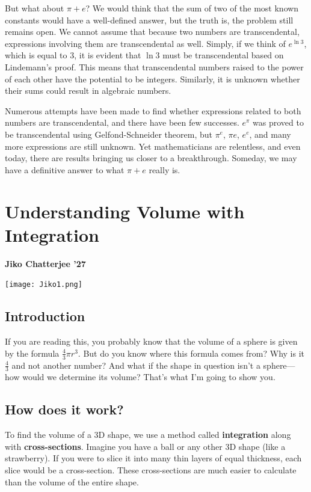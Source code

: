 \documentclass{article}
\begin{document}
\begin{multicols}{2}
But what about $\pi + e$? We would think that the sum of two of the most known constants would have a well-defined answer, but the truth is, the problem still remains open. We cannot assume that because two numbers are transcendental, expressions involving them are transcendental as well. Simply, if we think of $e^{\ln{3}}$, which is equal to $3$, it is evident that $\ln{3}$ must be transcendental based on Lindemann’s proof. This means that transcendental numbers raised to the power of each other have the potential to be integers. Similarly, it is unknown whether their sums could result in algebraic numbers.

Numerous attempts have been made to find whether expressions related to both numbers are transcendental, and there have been few successes. $e^{\pi}$ was proved to be transcendental using Gelfond-Schneider theorem, but $\pi^{e}$, $\pi e$, $e^{e}$, and many more expressions are still unknown. Yet mathematicians are relentless, and even today, there are results bringing us closer to a breakthrough. Someday, we may have a definitive answer to what $\pi + e$ really is.

\section*{Understanding Volume with Integration}
\noindent\textbf{Jiko Chatterjee '27}
\begin{center}
    \texttt{[image: Jiko1.png]}
\end{center}
\subsection*{Introduction}
If you are reading this, you probably know that the volume of a sphere is given by the formula $\frac{4}{3}\pi{r}^{3}$. But do you know where this formula comes from? Why is it $\frac{4}{3}$ and not another number? And what if the shape in question isn’t a sphere---how would we determine its volume? That’s what I’m going to show you.

\subsection*{How does it work?}

To find the volume of a 3D shape, we use a method called \textbf{integration} along with \textbf{cross-sections}. Imagine you have a ball or any other 3D shape (like a strawberry). If you were to slice it into many thin layers of equal thickness, each slice would be a cross-section. These cross-sections are much easier to calculate than the volume of the entire shape.


\end{multicols}
\end{document}
